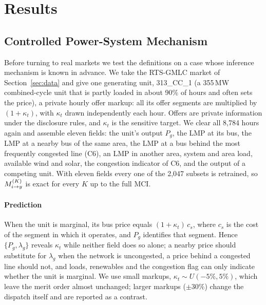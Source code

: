 \section{Results}\label{sec:results}
\subsection{Controlled Power-System Mechanism}\label{sec:res-mech}

Before turning to real markets we test the definitions on a case whose inference mechanism is known
in advance. We take the RTS-GMLC market of Section~\ref{sec:data} and give one generating unit,
313\_CC\_1 (a 355\,MW combined-cycle unit that is partly loaded in about 90\% of hours and often sets
the price), a private hourly offer markup: all its offer segments are multiplied by $(1+\kappa_t)$,
with $\kappa_t$ drawn independently each hour. Offers are private information under the disclosure
rules, and $\kappa_t$ is the sensitive target. We clear all 8,784 hours again and assemble eleven
fields: the unit's output $P_g$, the LMP at its bus, the LMP at a nearby bus of the same area, the
LMP at a bus behind the most frequently congested line (C6), an LMP in another area, system and area
load, available wind and solar, the congestion indicator of C6, and the output of a competing unit.
With eleven fields every one of the 2,047 subsets is retrained, so $M^{(K)}_{i \to y}$ is exact for every $K$ up to
the full MCI.

\paragraph{Prediction}
When the unit is marginal, its bus price equals $(1+\kappa_t)\,c_s$, where $c_s$ is the cost of the
segment in which it operates, and $P_g$ identifies that segment. Hence $\{P_g,\lambda_g\}$ reveals
$\kappa_t$ while neither field does so alone; a nearby price should substitute for $\lambda_g$ when the
network is uncongested, a price behind a congested line should not, and loads, renewables and the
congestion flag can only indicate whether the unit is marginal. We use small markups,
$\kappa_t\sim U(-5\%,5\%)$, which leave the merit order almost unchanged; larger markups
($\pm30\%$) change the dispatch itself and are reported as a contrast.

